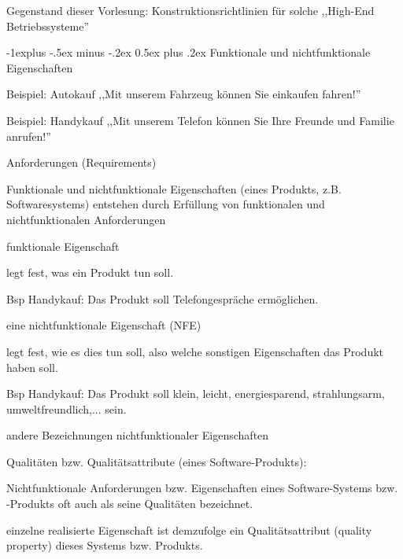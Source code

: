 \documentclass[a4paper]{article}
\makeatletter
\renewcommand{\subsection}{\@startsection{subsection}{2}{0mm}%
 {-1explus -.5ex minus -.2ex}%
 {0.5ex plus .2ex}%
 {\normalfont\normalsize\bfseries}}
\makeatother
\begin{document}
\begin{multicols}{3}
    Gegenstand dieser Vorlesung: Konstruktionsrichtlinien für solche
    ,,High-End Betriebssysteme''


    \subsection{Funktionale und nichtfunktionale
        Eigenschaften}

    \begin{itemize*}
        \item
        Beispiel: Autokauf ,,Mit unserem Fahrzeug können Sie einkaufen
        fahren!''
        \item
        Beispiel: Handykauf ,,Mit unserem Telefon können Sie Ihre Freunde und
        Familie anrufen!''
        \item
        Anforderungen (Requirements)
        \begin{itemize*}
            \item Funktionale und nichtfunktionale Eigenschaften (eines Produkts, z.B. Softwaresystems) entstehen durch Erfüllung von funktionalen und nichtfunktionalen Anforderungen
        \end{itemize*}
        \item
        funktionale Eigenschaft
        \begin{itemize*}
            \item legt fest, was ein Produkt tun soll.
            \item Bsp Handykauf: Das Produkt soll Telefongespräche ermöglichen.
        \end{itemize*}
        \item
        eine nichtfunktionale Eigenschaft (NFE)
        \begin{itemize*}
            \item legt fest, wie es dies tun soll, also welche sonstigen Eigenschaften das Produkt haben soll.
            \item Bsp Handykauf: Das Produkt soll klein, leicht, energiesparend, strahlungsarm, umweltfreundlich,... sein.
        \end{itemize*}
        \item
        andere Bezeichnungen nichtfunktionaler Eigenschaften
        \begin{itemize*}
            \item Qualitäten bzw. Qualitätsattribute (eines Software-Produkts): \begin{itemize*} \item   Nichtfunktionale Anforderungen bzw. Eigenschaften eines   Software-Systems bzw. -Produkts oft auch als seine Qualitäten   bezeichnet. \item   einzelne realisierte Eigenschaft ist demzufolge ein   Qualitätsattribut (quality property) dieses Systems bzw. Produkts. \end{itemize*}

\end{itemize*}
\end{itemize*}
\end{multicols}
\end{document}
